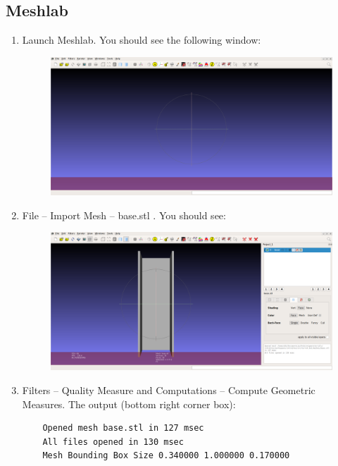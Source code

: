 \documentclass{article}
\begin{document}
        \subsection{Meshlab}
            \begin{enumerate}
                \item Launch Meshlab. You should see the following window:
                \begin{figure}[H]
                    \center
                    \includegraphics[width = \textwidth]{image_1.png}
                \end{figure}
                \item File -- Import Mesh -- base.stl . You should see:
                \begin{figure}[H]
                    \center
                    \includegraphics[width = \textwidth]{image_2.png}
                \end{figure}
                \item Filters -- Quality Measure and Computations -- Compute Geometric Measures. The output (bottom right corner box):
                \begin{verbatim}
    Opened mesh base.stl in 127 msec
    All files opened in 130 msec
    Mesh Bounding Box Size 0.340000 1.000000 0.170000

\end{verbatim}
\end{enumerate}
\end{document}
